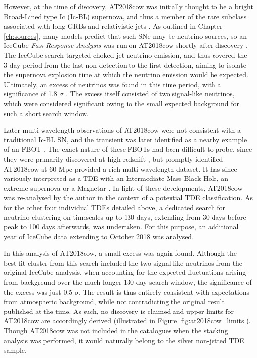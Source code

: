 However, at the time of discovery, AT2018cow was initially thought to be a bright Broad-Lined type Ic (Ic-BL) supernova, and thus a member of the rare subclass associated with long GRBs and relativistic jets . As outlined in Chapter \ref{ch:sources}, many models predict that such SNe may be neutrino sources, so an IceCube \emph{Fast Response Analysis} was run on AT2018cow shortly after discovery . The IceCube search targeted choked-jet neutrino emission, and thus covered the 3-day period from the last non-detection to the first detection, aiming to isolate the supernova explosion time at which the neutrino emission would be expected. Ultimately, an excess of neutrinos was found in this time period, with a significance of 1.8 $\sigma$ . The excess itself consisted of two signal-like neutrinos, which were considered significant owing to the small expected background for such a short search window.

Later multi-wavelength observations of AT2018cow were not consistent with a traditional Ic-BL SN, and the transient was later identified as a nearby example of an FBOT . The exact nature of these FBOTs had been difficult to probe, since they were primarily discovered at high redshift \cite{drout_fbot}, but promptly-identified AT2018cow at 60 Mpc provided a rich multi-wavelength dataset. It has since variously interpreted as a TDE with an Intermediate-Mass Black Hole, an extreme supernova or a Magnetar . In light of these developments, AT2018cow was re-analysed by the author in the context of a potential TDE classification. As for the other four individual TDEs detailed above, a dedicated search for neutrino clustering on timescales up to 130 days, extending from 30 days before peak to 100 days afterwards, was undertaken.  For this purpose, an additional year of IceCube data extending to October 2018 was analysed.

In this analysis of AT2018cow, a small excess was again found. Although the best-fit cluster from this search included the two signal-like neutrinos from the original IceCube analysis, when accounting for the expected fluctuations arising from background over the much longer 130 day search window, the significance of the excess was just 0.5 $\sigma$. The result is thus entirely consistent with expectations from atmospheric background, while not contradicting the original result published at the time. As such, no discovery is claimed and upper limits for AT2018cow are accordingly derived (illustrated in Figure \ref{fig:at2018cow_limits}). Though AT2018cow was not included in the catalogues when the stacking analysis was performed, it would naturally belong to the silver non-jetted TDE sample. 

